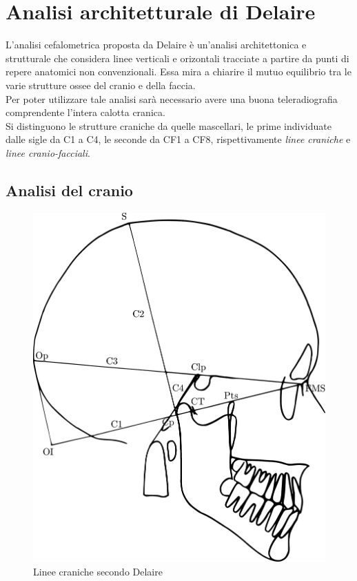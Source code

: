 \chapter{Analisi architetturale di Delaire}
\nocite{Delaire1981,Cudia1991}

L'analisi cefalometrica proposta da Delaire è un'analisi architettonica e strutturale che considera linee verticali e orizontali tracciate a partire da punti di repere anatomici non convenzionali. Essa mira a chiarire il mutuo equilibrio tra le varie strutture ossee del cranio e della faccia.\\
Per poter utilizzare tale analisi sarà necessario avere una buona teleradiografia comprendente l'intera calotta cranica.\\

Si distinguono le strutture craniche da quelle mascellari, le prime individuate dalle sigle da C1 a C4, le seconde da CF1 a CF8, rispettivamente \emph{linee craniche} e \emph{linee cranio-facciali}.\\

\section{Analisi del cranio}

\begin{figure}[!h]
\centering
\includegraphics[width=.5\textwidth]{./images/delaire_craniali.pdf}
\caption{Linee craniche secondo Delaire}
\label{fig:delaire_craniche}
\end{figure}

